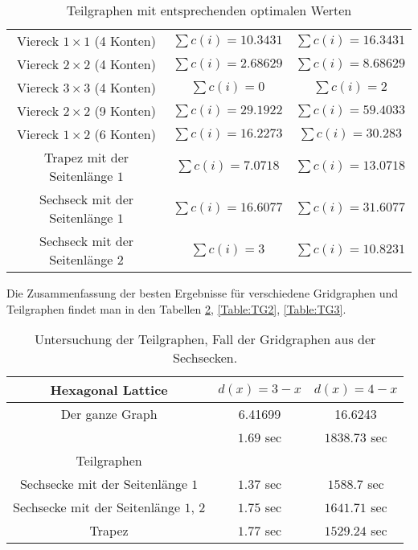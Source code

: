 \documentclass[
	fontsize=12pt,
	paper=a4,
	twoside=false,
	numbers=noenddot,
	plainheadsepline,
	toc=listof,
	toc=bibliography
]{scrartcl}
\begin{document}
\begin{itemize}
\begin{table}[htbp]
\begin{tabular}{|c|c|c|}
		Viereck $1\times 1$ (4 Konten) &  $\sum{c(i)}=10.3431$ & $\sum{c(i)}=16.3431$ \\ 
		Viereck $2\times 2$ (4 Konten) &  $\sum{c(i)}=2.68629$ & $\sum{c(i)}=8.68629$ \\ 
		Viereck $3\times 3$ (4 Konten) &  $\sum{c(i)}=0$ & $\sum{c(i)}=2$ \\ 
		
		Viereck $2\times 2$ (9 Konten) &  $\sum{c(i)}=29.1922$ & $\sum{c(i)}=59.4033$ \\  
		
		Viereck $1\times 2$ (6 Konten) &  $\sum{c(i)}=16.2273$ & $\sum{c(i)}=30.283$ \\  \hline
		
		Trapez mit der Seitenlänge $1$ &  $\sum{c(i)}=7.0718$ & $\sum{c(i)}=13.0718$ \\ \hline
		
		Sechseck mit der Seitenlänge $1$ & $\sum{c(i)}=16.6077$ & $\sum{c(i)}=31.6077$ \\
		Sechseck mit der Seitenlänge $2$ & $\sum{c(i)}=3$ & $\sum{c(i)}=10.8231$ \\ \hline
		
	\end{tabular}
	\caption{Teilgraphen mit entsprechenden optimalen Werten} 
	\label{Table:TG0}
	\end{table}
	
	Die Zusammenfassung der besten Ergebnisse für verschiedene Gridgraphen und Teilgraphen findet man in den Tabellen \ref{Table:TG1}, \ref{Table:TG2}, \ref{Table:TG3}.

	\begin{table}[htbp]
	\centering
	\begin{tabular}{|c|c|c|}
	\hline Hexagonal Lattice& $d(x)=3-x$  & $d(x)=4-x$\\ \hline 
		Der ganze Graph	&  6.41699	& 16.6243 \\ 
			& $1.69$ sec	& $1838.73$ sec \\ \hline
		Teilgraphen & & \\\hline
		Sechsecke mit der Seitenlänge $1$& $1.37$ sec	&  $1588.7$ sec \\ \hline
		Sechsecke mit der Seitenlänge $1$, $2$	& $1.75$ sec	&  $1641.71$ sec \\ \hline
		\rowcolor{red} Trapez& $1.77$ sec  &  $1529.24$ sec \\ \hline
	\end{tabular}
	\caption{Untersuchung der Teilgraphen, Fall der Gridgraphen aus der Sechsecken.} 
	\label{Table:TG1}
	\end{table}
	

\end{itemize}
\end{document}
